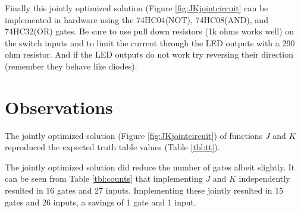 \documentclass[12pt]{article}
\begin{document}
Finally this jointly optimized solution (Figure \ref{fig:JKjointcircuit}
can be implemented in hardware using the 74HC04(NOT), 74HC08(AND),
and 74HC32(OR) gates.
Be sure to use pull down resistors (1k ohms works well) on the switch inputs
and to limit the current through the LED outputs with a 290 ohm resistor.
And if the LED outputs do not work try reversing their direction (remember
they behave like diodes).

\clearpage

\section{Observations}

The jointly optimized solution (Figure \ref{fig:JKjointcircuit}) of functions
$J$ and $K$ reproduced the expected truth table values (Table \ref{tbl:tt}).

The jointly optimized solution did reduce the number of gates
albeit slightly.
It can be seen from Table \ref{tbl:counts} that implementing
$J$ and $K$ independently resulted in 16 gates and 27 inputs.
Implementing these jointly resulted in 15 gates and 26 inputs,
a savings of 1 gate and 1 input.
\end{document}
